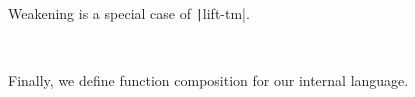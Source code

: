 {\begin{code}
\\
\>   \AgdaSymbol{(}  \AgdaSymbol{)} \AgdaSymbol{=}         \<%
\\
\>      \AgdaSymbol{=}   \<%
\\
\>   \AgdaSymbol{(} \AgdaSymbol{)} \AgdaSymbol{=}  \AgdaSymbol{(}   \AgdaSymbol{)}\<%
\\
\>   \AgdaSymbol{(}  \AgdaSymbol{)} \AgdaSymbol{=}  \AgdaSymbol{(}   \AgdaSymbol{)} \AgdaSymbol{(}   \AgdaSymbol{)}\<%
\\
\>   \AgdaSymbol{(} \AgdaSymbol{)} \AgdaSymbol{=}  \AgdaSymbol{(}   \AgdaSymbol{)}\<%
\end{code}
}

Weakening is a special case of \texttt|lift-tm|.

\begin{code}%
\> \AgdaSymbol{:}  \AgdaSymbol{\{}  \AgdaSymbol{\}}      \AgdaSymbol{(} \AgdaInductiveConstructor{::} \AgdaSymbol{)}  \<%
\\
\> \AgdaSymbol{=}  \AgdaSymbol{\_} \<%
\end{code}

Finally, we define function composition for our internal language.

